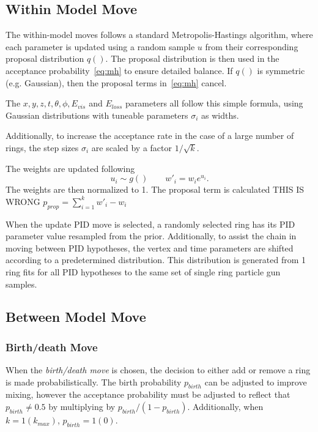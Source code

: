 \documentclass[11pt]{article} %
\begin{document}
\subsection{Within Model Move}
The within-model moves follows a standard Metropolis-Hastings algorithm, where each parameter is updated using a random sample $u$ from their corresponding proposal distribution $q()$. The proposal distribution is then used in the acceptance probability~\ref{eq:mh} to ensure detailed balance. If $q()$ is symmetric (e.g. Gaussian), then the proposal terms in~\ref{eq:mh} cancel. 

The $x,y,z,t,\theta,\phi,E_{vis}$ and $E_{loss}$ parameters all follow this simple formula, using Gaussian distributions with tuneable parameters $\sigma_{i}$ as widths.

Additionally, to increase the acceptance rate in the case of a large number of rings, the step sizes $\sigma_{i}$ are scaled by a factor $1/\sqrt{k}$.

The weights are updated following 
\begin{equation}
u_{i}\sim g()\qquad w'_{i} = w_{i}e^{u_{i}}.
\end{equation}
The weights are then normalized to 1. The proposal term is calculated THIS IS WRONG $p_{prop}=\sum^{k}_{i=1}w'_{i}-w_{i}$

When the update PID move is selected, a randomly selected ring has its PID parameter value resampled from the prior. Additionally, to assist the chain in moving between PID hypotheses, the vertex and time parameters are shifted according to a predetermined distribution. This distribution is generated from 1 ring fits for all PID hypotheses to the same set of single ring particle gun samples.

\subsection{Between Model Move}
\subsubsection{Birth/death Move}
When the \emph{birth/death move} is chosen, the decision to either add or remove a ring is made probabilistically. The birth probability $p_{birth}$ can be adjusted to improve mixing, however the acceptance probability must be adjusted to reflect that $p_{birth}\neq 0.5$ by multiplying by $p_{birth} / (1 - p_{birth})$. Additionally, when $k=1 (k_{max})$, $p_{birth} = 1 (0)$. 
\end{document}
